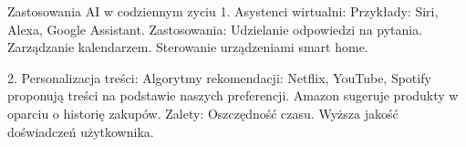\begin{frame}{Zastosowania AI w codziennym zyciu}
1. Asystenci wirtualni:
Przykłady: 
Siri, 
Alexa, 
Google Assistant.
Zastosowania:
Udzielanie odpowiedzi na pytania.
Zarządzanie kalendarzem.
Sterowanie urządzeniami smart home.

2. Personalizacja treści:
Algorytmy rekomendacji:
Netflix, YouTube, Spotify proponują treści na podstawie naszych preferencji.
Amazon sugeruje produkty w oparciu o historię zakupów.
Zalety:
Oszczędność czasu.
Wyższa jakość doświadczeń użytkownika.
\end{frame}
